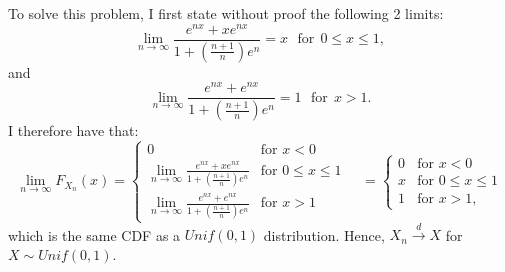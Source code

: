 \begin{problem}{9}  To solve this problem, I first state without proof the following 2 limits:
\begin{equation*}
\lim_{n\rightarrow \infty}\frac{e^{nx}+xe^{nx}}{1+\left(\frac{n+1}{n}\right) e^n} = x~~~\mathrm{for}~~0\le x \le1,
\end{equation*}
and
\begin{equation*}
\lim_{n\rightarrow \infty}\frac{e^{nx}+e^{nx}}{1+\left(\frac{n+1}{n}\right) e^n} = 1~~~\mathrm{for}~~x>1.
\end{equation*}
I therefore have that:
\begin{equation*}  
\lim_{n \rightarrow \infty} F_{X_n}(x) = \begin{cases}
				0 & \text{for $x < 0$} \\
                                  \lim_{n\rightarrow \infty}\frac{e^{nx}+xe^{nx}}{1+\left(\frac{n+1}{n}\right) e^n} & \text{for $0\le x \le 1$} \\
                                   \lim_{n\rightarrow \infty}\frac{e^{nx}+e^{nx}}{1+\left(\frac{n+1}{n}\right) e^n}& \text{for $x>1$} 
       \end{cases} \quad
= \begin{cases}
                                   0 & \text{for $x < 0$} \\
                                   x & \text{for $0\le x \le 1$}\\
                                   1 & \text{for $x >1$},
\end{cases}
\end{equation*}
which is the same CDF as a $Unif(0,1)$ distribution.  Hence, $X_n \xrightarrow{d} X$ for $X\sim Unif(0,1)$.

\end{problem}

